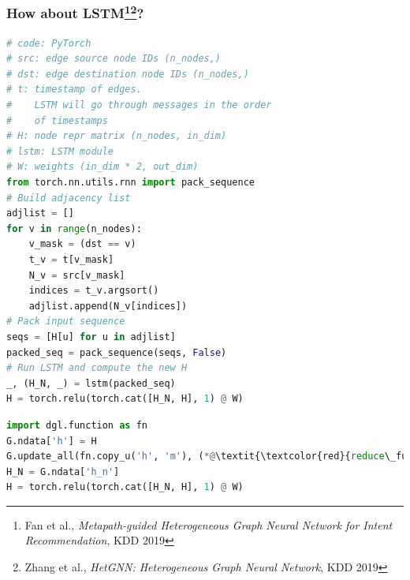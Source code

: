 \documentclass[10pt,aspectratio=169]{beamer}
\begin{document}
	\begin{frame}[fragile]
		\frametitle{How about LSTM\footnote{Fan et al., \emph{Metapath-guided Heterogeneous Graph Neural Network for Intent Recommendation}, KDD 2019}\footnote{Zhang et al., \emph{HetGNN: Heterogeneous Graph Neural Network}, KDD 2019}?}
		\begin{minipage}{0.5\textwidth}
\begin{lstlisting}[language=Python]
# code: PyTorch
# src: edge source node IDs (n_nodes,)
# dst: edge destination node IDs (n_nodes,)
# t: timestamp of edges.
#    LSTM will go through messages in the order
#    of timestamps
# H: node repr matrix (n_nodes, in_dim)
# lstm: LSTM module
# W: weights (in_dim * 2, out_dim)
from torch.nn.utils.rnn import pack_sequence
# Build adjacency list
adjlist = []
for v in range(n_nodes): 
    v_mask = (dst == v) 
    t_v = t[v_mask] 
    N_v = src[v_mask] 
    indices = t_v.argsort() 
    adjlist.append(N_v[indices])
# Pack input sequence
seqs = [H[u] for u in adjlist]
packed_seq = pack_sequence(seqs, False)
# Run LSTM and compute the new H
_, (H_N, _) = lstm(packed_seq)
H = torch.relu(torch.cat([H_N, H], 1) @ W)
\end{lstlisting}
		\end{minipage}%
		\begin{minipage}{0.5\textwidth}
\begin{lstlisting}[language=Python]
import dgl.function as fn
G.ndata['h'] = H
G.update_all(fn.copy_u('h', 'm'), (*@\textit{\textcolor{red}{reduce\_func}}@*))
H_N = G.ndata['h_n']
H = torch.relu(torch.cat([H_N, H], 1) @ W)
\end{lstlisting}
		\end{minipage}
	\end{frame}
\end{document}
